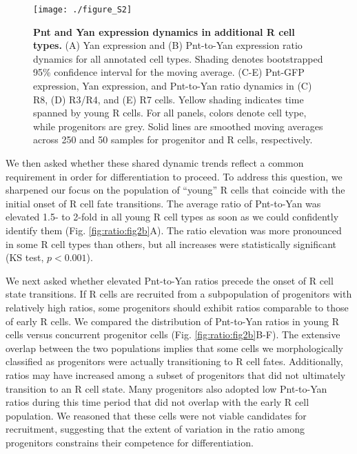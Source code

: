 \begin{figure}[h!]
\centering
\vspace{0pt}
\texttt{[image: ./figure\_S2]}
\caption[Pnt and Yan expression dynamics in additional R cell types.]{\textbf{Pnt and Yan expression dynamics in additional R cell types.} (A) Yan expression and (B) Pnt-to-Yan expression ratio dynamics for all annotated cell types. Shading denotes bootstrapped 95\% confidence interval for the moving average. (C-E) Pnt-GFP expression, Yan expression, and Pnt-to-Yan ratio dynamics in (C) R8, (D) R3/R4, and (E) R7 cells. Yellow shading indicates time spanned by young R cells. For all panels, colors denote cell type, while progenitors are grey. Solid lines are smoothed moving averages across 250 and 50 samples for progenitor and R cells, respectively.}
\label{fig:ratio:figS2}
\end{figure}

We then asked whether these shared dynamic trends reflect a common requirement in order for differentiation to proceed. To address this question, we sharpened our focus on the population of ``young'' R cells that coincide with the initial onset of R cell fate transitions. The average ratio of Pnt-to-Yan was elevated 1.5- to 2-fold in all young R cell types as soon as we could confidently identify them (Fig. \ref{fig:ratio:fig2b}A). The ratio elevation was more pronounced in some R cell types than others, but all increases were statistically significant (KS test, $p<0.001$).

We next asked whether elevated Pnt-to-Yan ratios precede the onset of R cell state transitions. If R cells are recruited from a subpopulation of progenitors with relatively high ratios, some progenitors should exhibit ratios comparable to those of early R cells. We compared the distribution of Pnt-to-Yan ratios in young R cells versus concurrent progenitor cells (Fig. \ref{fig:ratio:fig2b}B-F). The extensive overlap between the two populations implies that some cells we morphologically classified as progenitors were actually transitioning to R cell fates. Additionally, ratios may have increased among a subset of progenitors that did not ultimately transition to an R cell state. Many progenitors also adopted low Pnt-to-Yan ratios during this time period that did not overlap with the early R cell population. We reasoned that these cells were not viable candidates for recruitment, suggesting that the extent of variation in the ratio among progenitors constrains their competence for differentiation.

